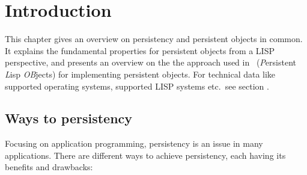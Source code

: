 %

\chapter{Introduction}

%
This chapter gives an overview on persistency and persistent objects
in common.  It explains the fundamental properties for persistent
objects from a LISP perspective, and presents an overview on the the
approach used in \plob\ (\emph{P}ersistent \emph{L}isp \emph{OB}jects)
for implementing persistent objects. For technical data like supported
operating systems, supported LISP systems etc.\ see
section .

\section{Ways to persistency}

Focusing on application programming, persistency is an issue in many
applications. There are different ways to achieve persistency, each
having its benefits and drawbacks:


